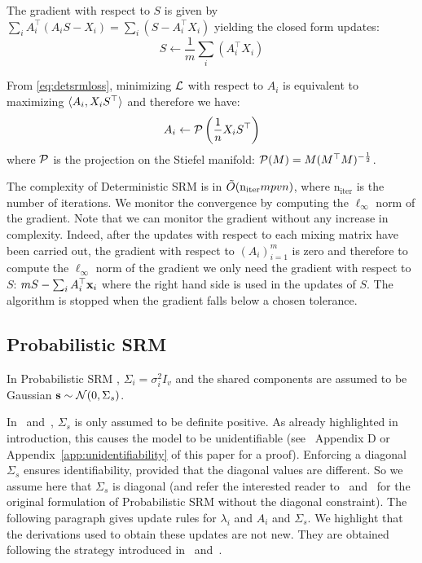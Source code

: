 \documentclass{article}
\begin{document}
The gradient with respect to $S$ is given by $\sum_i A_i^{\top}(A_i S -
X_i) = \sum_i (S - A_i^{\top} X_i)$
yielding the closed form updates:
\begin{equation}
  S \leftarrow  \frac1m \sum_i (A_i^{\top} X_i)
  \label{eq:srm:supdate}
\end{equation}

From \eqref{eq:detsrmloss}, minimizing $\mathcal{L}$ with respect to $A_i$ is
equivalent to maximizing $\langle{ A_i},{ X_i S^{\top} }\rangle$ and therefore we
have:
\begin{equation}
  A_i \leftarrow  \mathcal{P} \left(\frac1{n}X_i S^{\top} \right)
  \label{eq:detsrm:Aiupdate}
\end{equation}
where $\mathcal{P}$ is the projection on the Stiefel manifold: $\mathcal{P}(M) = M
(M^{\top}M)^{-\frac12}$.
%


The complexity of Deterministic SRM is in $\tilde{O}(\mathrm{n_{iter}} mpvn)$, where
 $\mathrm{n_{iter}}$ is the number of iterations.
%
We monitor the convergence by computing the $\ell_{\infty}$ norm of the
gradient.
%
Note that we can monitor the gradient without any increase in complexity.
%
Indeed, after the updates with respect to each mixing matrix have been
carried out, the gradient with respect to $(A_i)_{i=1}^m$ is zero and therefore
to compute the $\ell_{\infty}$ norm of the gradient we only need the gradient
with respect to $S$: $m S - \sum_i A_i^{\top}\mathbf{x}_i$ where the right hand side is
used in the updates of $S$.
%
The algorithm is stopped when the
gradient falls below a chosen tolerance.
%


\subsection{Probabilistic SRM}
\label{sec:probabilisticsrm}
In Probabilistic SRM , $\Sigma_i=\sigma_i^2 I_v$ and the shared
components are assumed to be Gaussian $\mathbf{s} \sim \mathcal{N}(0, \Sigma_s)$.
%

In~\cite{chen2015reduced} and~\cite{anderson2016enabling}, $\Sigma_s$ is only assumed to be definite positive.
%
As already highlighted in introduction, this causes the model to be
unidentifiable (see~\cite{richard2020modeling} Appendix D or Appendix~\ref{app:unidentifiability} of this paper for a proof). Enforcing a diagonal $\Sigma_s$ ensures identifiability, provided that the diagonal values are different.
%
So we assume here that $\Sigma_s$ is diagonal (and refer the interested reader
to~\cite{chen2015reduced} and~\cite{anderson2016enabling} for the original formulation of Probabilistic SRM
without the diagonal constraint). The following paragraph gives update rules for $\lambda_i$ and $A_i$ and $\Sigma_s$. We highlight that the derivations used to obtain these updates are not new. They are obtained following the strategy introduced in~\cite{anderson2016enabling} and~\cite{chen2015reduced}.
%
\end{document}
